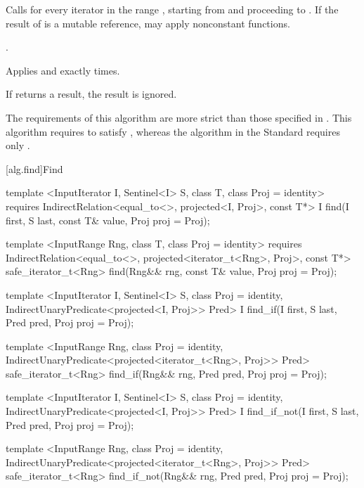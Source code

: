 \begin{itemdescr}
\pnum
\effects
Calls
 for every iterator
 in the range
,
starting from
and proceeding to
.
\enternote If the result of
 is a mutable reference,  may apply
nonconstant functions.\exitnote

\pnum
\returns
{}.

\pnum
\complexity
Applies  and 
exactly
times.

\pnum
\notes
If  returns a result, the result is ignored.

\pnum
\enternote The requirements of this algorithm are more strict than those
specified in . This algorithm requires  to
satisfy , whereas the algorithm in the \Cpp Standard
requires only . \exitnote
\end{itemdescr}

[alg.find]{Find}

%
%
%
\begin{itemdecl}
template <InputIterator I, Sentinel<I> S, class T, class Proj = identity>
  requires IndirectRelation<equal_to<>, projected<I, Proj>, const T*>
  I find(I first, S last, const T& value, Proj proj = Proj{});

template <InputRange Rng, class T, class Proj = identity>
  requires IndirectRelation<equal_to<>, projected<iterator_t<Rng>, Proj>, const T*>
  safe_iterator_t<Rng>
    find(Rng&& rng, const T& value, Proj proj = Proj{});

template <InputIterator I, Sentinel<I> S, class Proj = identity,
    IndirectUnaryPredicate<projected<I, Proj>> Pred>
  I find_if(I first, S last, Pred pred, Proj proj = Proj{});

template <InputRange Rng, class Proj = identity,
    IndirectUnaryPredicate<projected<iterator_t<Rng>, Proj>> Pred>
  safe_iterator_t<Rng>
    find_if(Rng&& rng, Pred pred, Proj proj = Proj{});

template <InputIterator I, Sentinel<I> S, class Proj = identity,
    IndirectUnaryPredicate<projected<I, Proj>> Pred>
  I find_if_not(I first, S last, Pred pred, Proj proj = Proj{});

template <InputRange Rng, class Proj = identity,
    IndirectUnaryPredicate<projected<iterator_t<Rng>, Proj>> Pred>
  safe_iterator_t<Rng>
    find_if_not(Rng&& rng, Pred pred, Proj proj = Proj{});
\end{itemdecl}

